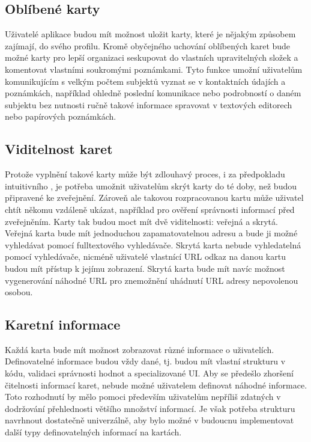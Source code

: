 	\subsection{Oblíbené karty}

	Uživatelé aplikace budou mít možnost uložit karty, které je nějakým způsobem zajímají, do svého profilu.
	Kromě obyčejného uchování oblíbených karet bude možné karty pro lepší organizaci seskupovat do vlastních upravitelných
	složek a komentovat vlastními soukromými poznámkami.
	Tyto funkce umožní uživatelům komunikujícím s velkým počtem subjektů vyznat se v kontaktních údajích a poznámkách,
	například ohledně poslední komunikace nebo podrobností o daném subjektu bez nutnosti ručně takové informace spravovat v
	textových editorech nebo papírových poznámkách.

	\subsection{Viditelnost karet}

	Protože vyplnění takové karty může být zdlouhavý proces, i za předpokladu intuitivního , je potřeba umožnit
	uživatelům skrýt karty do té doby, než budou připravené ke zveřejnění.
	Zároveň ale takovou rozpracovanou kartu může uživatel chtít někomu vzdáleně ukázat, například pro ověření správnosti informací
	před zveřejněním.
	Karty tak budou moct mít dvě viditelnosti: veřejná a skrytá.
	Veřejná karta bude mít jednoduchou zapamatovatelnou  adresu a bude ji možné vyhledávat pomocí fulltextového vyhledávače.
	Skrytá karta nebude vyhledatelná pomocí vyhledávače, nicméně uživatelé vlastnící \ac{URL} odkaz na danou kartu budou mít přístup
	k jejímu zobrazení.
	Skrytá karta bude mít navíc možnost vygenerování náhodné \ac{URL} pro znemožnění uhádnutí \ac{URL} adresy nepovolenou osobou.

	\subsection{Karetní informace}

	Každá karta bude mít možnost zobrazovat různé informace o uživatelích.
	Definovatelné informace budou vždy dané, tj. budou mít vlastní strukturu v kódu, validaci správnosti hodnot a specializované
	\ac{UI}.
	Aby se předešlo zhoršení čitelnosti informací karet, nebude možné uživatelem definovat náhodné informace.
	Toto rozhodnutí by mělo pomoci především uživatelům nepříliš zdatných v dodržování přehlednosti většího množství
	informací.
	Je však potřeba strukturu navrhnout dostatečně univerzálně, aby bylo možné v budoucnu implementovat další typy definovatelných informací
	na kartách.

